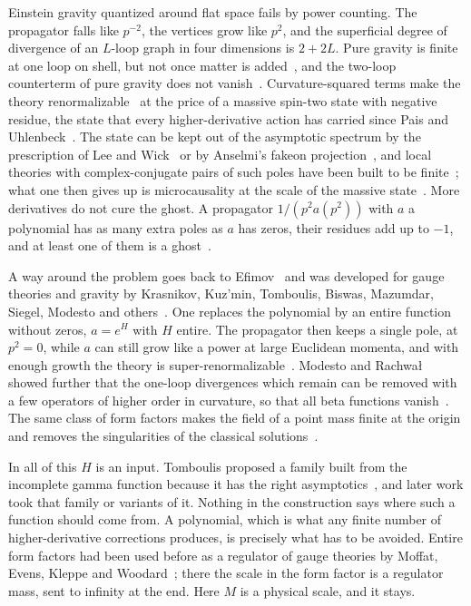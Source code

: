 \documentclass[a4paper,11pt]{article}
\begin{document}
Einstein gravity quantized around flat space fails by power counting. The propagator falls like $p^{-2}$, the vertices grow like $p^{2}$, and the superficial degree of divergence of an $L$-loop graph in four dimensions is $2+2L$. Pure gravity is finite at one loop on shell, but not once matter is added~\cite{tHooftVeltman1974}, and the two-loop counterterm of pure gravity does not vanish~\cite{GoroffSagnotti1986}. Curvature-squared terms make the theory renormalizable~\cite{Stelle1977,FradkinTseytlin1982,SalvioStrumia2014} at the price of a massive spin-two state with negative residue, the state that every higher-derivative action has carried since Pais and Uhlenbeck~\cite{PaisUhlenbeck1950,Stelle1978}. The state can be kept out of the asymptotic spectrum by the prescription of Lee and Wick~\cite{LeeWick1969,GrinsteinOConnellWise2008} or by Anselmi's fakeon projection~\cite{Anselmi2018,DonoghueMenezes2019}, and local theories with complex-conjugate pairs of such poles have been built to be finite~\cite{ModestoShapiro2016,Modesto2016}; what one then gives up is microcausality at the scale of the massive state~\cite{AsoreyRachwalShapiro2018}. More derivatives do not cure the ghost. A propagator $1/(p^2a(p^2))$ with $a$ a polynomial has as many extra poles as $a$ has zeros, their residues add up to $-1$, and at least one of them is a ghost~\cite{Shapiro2015}.

A way around the problem goes back to Efimov~\cite{Efimov1967} and was developed for gauge theories and gravity by Krasnikov, Kuz'min, Tomboulis, Biswas, Mazumdar, Siegel, Modesto and others~\cite{Krasnikov1987,Kuzmin1989,Tomboulis1997,BiswasMazumdarSiegel2006,BGKM2012,Modesto2012,ModestoRachwal2014}. One replaces the polynomial by an entire function without zeros, $a=e^{H}$ with $H$ entire. The propagator then keeps a single pole, at $p^2=0$, while $a$ can still grow like a power at large Euclidean momenta, and with enough growth the theory is super-renormalizable~\cite{Tomboulis2015,CalcagniModesto2015,ModestoRachwal2017}. Modesto and Rachwa{\l} showed further that the one-loop divergences which remain can be removed with a few operators of higher order in curvature, so that all beta functions vanish~\cite{ModestoRachwal2014}. The same class of form factors makes the field of a point mass finite at the origin and removes the singularities of the classical solutions~\cite{BGKM2012,Buoninfante2018,BuoninfanteLambiaseMazumdar2019}.

In all of this $H$ is an input. Tomboulis proposed a family built from the incomplete gamma function because it has the right asymptotics~\cite{Tomboulis1997}, and later work took that family or variants of it. Nothing in the construction says where such a function should come from. A polynomial, which is what any finite number of higher-derivative corrections produces, is precisely what has to be avoided. Entire form factors had been used before as a regulator of gauge theories by Moffat, Evens, Kleppe and Woodard~\cite{Moffat1990,EvensMoffatKleppeWoodard1991,KleppeWoodard1992}; there the scale in the form factor is a regulator mass, sent to infinity at the end. Here $M$ is a physical scale, and it stays.
\end{document}
